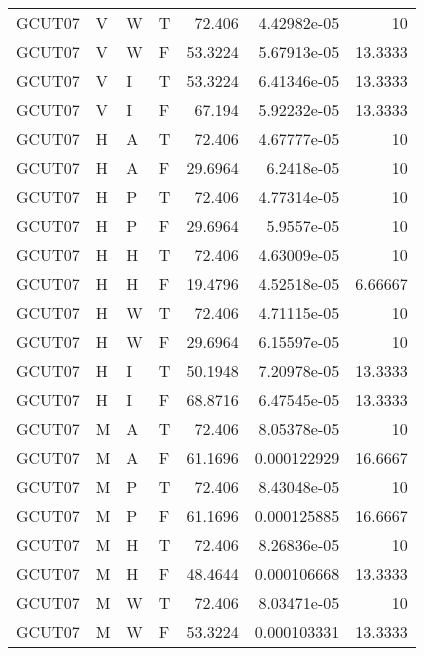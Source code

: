 \begin{longtable}{llllrrr}
    GCUT07   & V     & W     & T          & 72.406     & 4.42982e-05 & 10       \\
    GCUT07   & V     & W     & F          & 53.3224    & 5.67913e-05 & 13.3333  \\
    GCUT07   & V     & I     & T          & 53.3224    & 6.41346e-05 & 13.3333  \\
    GCUT07   & V     & I     & F          & 67.194     & 5.92232e-05 & 13.3333  \\
    GCUT07   & H     & A     & T          & 72.406     & 4.67777e-05 & 10       \\
    GCUT07   & H     & A     & F          & 29.6964    & 6.2418e-05  & 10       \\
    GCUT07   & H     & P     & T          & 72.406     & 4.77314e-05 & 10       \\
    GCUT07   & H     & P     & F          & 29.6964    & 5.9557e-05  & 10       \\
    GCUT07   & H     & H     & T          & 72.406     & 4.63009e-05 & 10       \\
    GCUT07   & H     & H     & F          & 19.4796    & 4.52518e-05 & 6.66667  \\
    GCUT07   & H     & W     & T          & 72.406     & 4.71115e-05 & 10       \\
    GCUT07   & H     & W     & F          & 29.6964    & 6.15597e-05 & 10       \\
    GCUT07   & H     & I     & T          & 50.1948    & 7.20978e-05 & 13.3333  \\
    GCUT07   & H     & I     & F          & 68.8716    & 6.47545e-05 & 13.3333  \\
    GCUT07   & M     & A     & T          & 72.406     & 8.05378e-05 & 10       \\
    GCUT07   & M     & A     & F          & 61.1696    & 0.000122929 & 16.6667  \\
    GCUT07   & M     & P     & T          & 72.406     & 8.43048e-05 & 10       \\
    GCUT07   & M     & P     & F          & 61.1696    & 0.000125885 & 16.6667  \\
    GCUT07   & M     & H     & T          & 72.406     & 8.26836e-05 & 10       \\
    GCUT07   & M     & H     & F          & 48.4644    & 0.000106668 & 13.3333  \\
    GCUT07   & M     & W     & T          & 72.406     & 8.03471e-05 & 10       \\
    GCUT07   & M     & W     & F          & 53.3224    & 0.000103331 & 13.3333  \\

\end{longtable}
